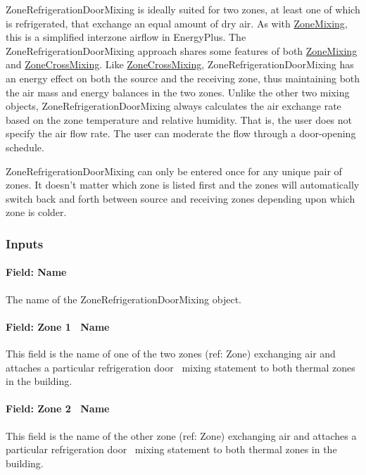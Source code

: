 ZoneRefrigerationDoorMixing is ideally suited for two zones, at least one of which is refrigerated, that exchange an equal amount of dry air. As with \hyperref[zonemixing]{ZoneMixing}, this is a simplified interzone airflow in EnergyPlus. The ZoneRefrigerationDoorMixing approach shares some features of both \hyperref[zonemixing]{ZoneMixing} and \hyperref[zonecrossmixing]{ZoneCrossMixing}. Like \hyperref[zonecrossmixing]{ZoneCrossMixing}, ZoneRefrigerationDoorMixing has an energy effect on both the source and the receiving zone, thus maintaining both the air mass and energy balances in the two zones. Unlike the other two mixing objects, ZoneRefrigerationDoorMixing always calculates the air exchange rate based on the zone temperature and relative humidity. That is, the user does not specify the air flow rate. The user can moderate the flow through a door-opening schedule.

ZoneRefrigerationDoorMixing can only be entered once for any unique pair of zones. It doesn't matter which zone is listed first and the zones will automatically switch back and forth between source and receiving zones depending upon which zone is colder.

\subsubsection{Inputs}\label{inputs-7-003}

\paragraph{Field: Name}\label{field-name-7-002}

The name of the ZoneRefrigerationDoorMixing object.

\paragraph{Field: Zone 1~ Name}\label{field-zone-1-name}

This field is the name of one of the two zones (ref: Zone) exchanging air and attaches a particular refrigeration door~ mixing statement to both thermal zones in the building.

\paragraph{Field: Zone 2~ Name}\label{field-zone-2-name}

This field is the name of the other zone (ref: Zone) exchanging air and attaches a particular refrigeration door~ mixing statement to both thermal zones in the building.

